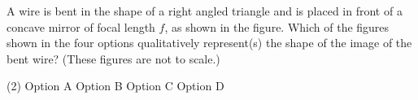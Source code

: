 
    \item A wire is bent in the shape of a right angled triangle and is placed in front of a concave mirror of focal length \( f \), as shown in the figure. Which of the figures shown in the four options qualitatively represent(s) the shape of the image of the bent wire? (These figures are not to scale.)
        \begin{tasks}(2)
            \task Option A
            \task Option B
            \task Option C
            \task Option D
        \end{tasks}
